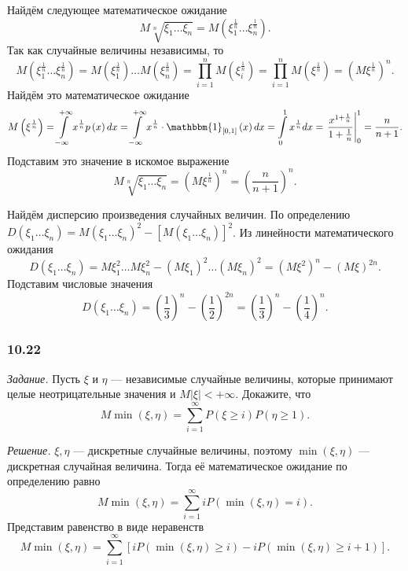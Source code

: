 Найдём следующее математическое ожидание
$$M \sqrt[n]{ \xi_1 \dotsc \xi_n} =
M \left( \xi_1^{ \frac{1}{n}} \dotsc \xi_n^{ \frac{1}{n}} \right).$$
Так как случайные величины независимы, то
$$M \left( \xi_1^{ \frac{1}{n}} \dotsc \xi_n^{ \frac{1}{n}} \right) =
M \left( \xi_1^{ \frac{1}{n}} \right) \dotsc M \left( \xi_n^{ \frac{1}{n}} \right) =
\prod \limits_{i=1}^n M \left( \xi_i^{ \frac{1}{n}} \right) =
\prod \limits_{i=1}^n M \left( \xi^{ \frac{1}{n}} \right) =
\left( M \xi^{ \frac{1}{n}} \right)^n.$$
Найдём это математическое ожидание
$$M \left( \xi^{ \frac{1}{n}} \right) =
\int \limits_{- \infty }^{+ \infty } x^{ \frac{1}{n}} p \left( x \right) dx =
\int \limits_{- \infty }^{+ \infty } x^{ \frac{1}{n}} \cdot \mathbbm{1}_{ \left[ 0, 1 \right] } \left( x \right) dx =
\int \limits_0^1 x^{ \frac{1}{n}} dx =
\left. \frac{x^{1+ \frac{1}{n}}}{1 + \frac{1}{n}} \right|_0^1 =
\frac{n}{n+1}.$$
Подставим это значение в искомое выражение
$$M \sqrt[n]{ \xi_1 \dotsc \xi_n} =
\left( M \xi^{ \frac{1}{n}} \right)^n =
\left( \frac{n}{n+1} \right)^n.$$

Найдём дисперсию произведения случайных величин.
По определению $D \left( \xi_1 \dotsc \xi_n \right) = M \left( \xi_1 \dotsc \xi_n \right)^2 - \left[ M \left( \xi_1 \dotsc \xi_n \right) \right]^2$.
Из линейности математического ожидания
$$D \left( \xi_1 \dotsc \xi_n \right) =
M \xi_1^2 \dotsc M \xi_n^2 - \left( M \xi_1 \right)^2 \dotsc \left( M \xi_n \right)^2 =
\left( M \xi^2 \right)^n - \left( M \xi \right)^{2n}.$$
Подставим числовые значения
$$D \left( \xi_1 \dotsc \xi_n \right) =
\left( \frac{1}{3} \right)^n - \left( \frac{1}{2} \right)^{2n} =
\left( \frac{1}{3} \right)^n - \left( \frac{1}{4} \right)^n.$$

\subsubsection*{10.22}

\textit{Задание.} Пусть $ \xi $ и $ \eta $ --- независимые случайные величины, которые принимают целые неотрицательные значения и $M \left| \xi \right| < + \infty $.
Докажите, что
$$M \min \left( \xi, \eta \right) =
\sum \limits_{i=1}^{ \infty } P \left( \xi \geq i \right) P \left( \eta \geq 1 \right).$$

\textit{Решение.} $ \xi, \eta $ --- дискретные случайные величины, поэтому $ \min \left( \xi, \eta \right) $ --- дискретная случайная величина.
Тогда её математическое ожидание по определению равно
$$M \min \left( \xi, \eta \right) =
\sum \limits_{i=1}^{ \infty } iP \left( \min \left( \xi, \eta \right) = i \right).$$
Представим равенство в виде неравенств
$$M \min \left( \xi, \eta \right) =
\sum \limits_{i=1}^{ \infty } \left[ iP \left( \min \left( \xi, \eta \right) \geq i \right) -
iP \left( \min \left( \xi, \eta \right) \geq i + 1 \right) \right].$$

